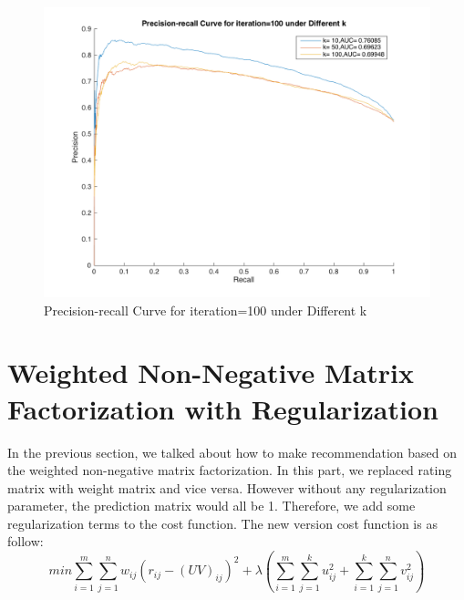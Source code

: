 \documentclass{article}
\begin{document}
\begin{figure}[htbp]
\centering
\includegraphics[width=.6\textwidth]{problem32.png}
\caption{Precision-recall Curve for iteration=100 under Different k}
\label{fig:problem32}
\end{figure}

\section{Weighted Non-Negative Matrix Factorization with Regularization}
In the previous section, we talked about how to make recommendation based on the weighted non-negative matrix factorization. In this part, we replaced rating matrix with weight matrix and vice versa. However without any regularization parameter, the prediction matrix would all be 1. Therefore, we add some regularization terms to the cost function. The new version cost function is as follow:
\begin{equation*}
min\sum_{i=1}^{m}\sum_{j=1}^{n}w_{ij}{(r_{ij}-{(UV)}_{ij})}^2 + \lambda\left( \sum_{i=1}^m\sum_{j=1}^ku_{ij}^2+\sum_{i=1}^k\sum_{j=1}^nv_{ij}^2\right) 
\end{equation*}
\end{document}
